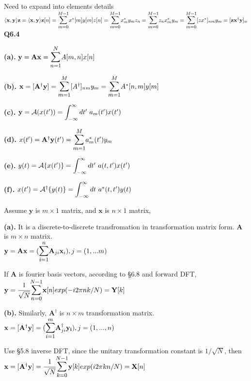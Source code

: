 \documentclass[12pt,a4paper]{article}
\begin{document}
    Need to expand into elements details\\
    $\langle \mathbf{x,y}\rangle \mathbf{z}=\mathbf{\langle x, y \rangle}\mathbf{z}[n]\\
    =\bsum{m=0}{M-1}x^*[m]y[m]z[n]\\
    =\bsum{m=0}{M-1}x^*_my_mz_n\\
    =\bsum{m=0}{M-1}z_nx^*_my_m\\
    =\bsum{m=0}{M-1}[zx^*]_{nm}y_m\\
    =[\mathbf{zx^\dagger y}]_n$
    \newpage
    \Large{\textbf{Q6.4}}

    \textbf{(a).} $\mathbf{y=Ax}=\bsum{n=1}{N}A[m,n]x[n]$

    \textbf{(b).} $\mathbf{x=[A^\dagger y]}=\bsum{m=1}{M}[A^\dagger]_{nm}y_m=\bsum{m=1}{M}A^*[n,m]y[m]$

    \textbf{(c).} $\mathbf{y}=\mathcal{A}(x(t'))=\bint{-\infty}{\infty}dt'\ a_m(t')x(t')$

    \textbf{(d).} $x(t')=\mathbf{A^\dagger y}(t')=\bsum{m=1}{M}a_m^*(t')y_m$

    \textbf{(e).} $y(t)=\mathcal{A}\{x(t')\}=\bint{-\infty}{\infty}dt'\ a(t,t')x(t')$

    \textbf{(f).} $x(t')=\mathcal{A}^\dagger\{y(t)\}=\bint{-\infty}{\infty}dt\ a^*(t, t')y(t)$

    \hrulefill

    Assume $\mathbf{y}$ is $m\times 1$ matrix, and $\mathbf{x}$ is $n\times 1$ matrix, 

    \textbf{(a).}
    It is a discrete-to-discrete transfromation in transformation matrix form. $\mathbf{A}$ is $m\times n$ matrix. \\
    $\mathbf{y}=\mathbf{Ax}=(\bsum{i=1}{n}\mathbf{A}_{ji}\mathbf{x}_i), j=(1,...m)$

    If $\mathbf{A}$ is fourier basis vectors, according to \S6.8 and forward DFT, \\
    $\mathbf{y}=\cfrac{1}{\sqrt{N}}\bsum{n=0}{N-1}\mathbf{x}[n]exp(-i2\pi nk/N)=\mathbf{Y}[k]$ 

    \textbf{(b).}
    Similarly, $\mathbf{A^\dagger}$ is $n\times m$ transformation matrix. \\
    $\mathbf{x}=[\mathbf{A^\dagger y}]=(\bsum{i=1}{m}\mathbf{A}^\dagger_{ji}\mathbf{y_i}), j=(1,...,n)$

    Use \S5.8 inverse DFT, since the unitary transformation constant is $1/\sqrt{N}$, then\\
    $\mathbf{x}=[\mathbf{A^\dagger y}]=\cfrac{1}{\sqrt{N}}\bsum{k=0}{N-1}\mathbf{y}[k]exp(i2\pi kn/N)=\mathbf{X}[n]$
\end{document}
